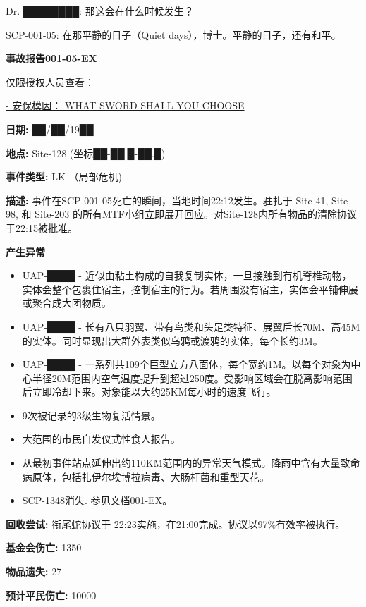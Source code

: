 \documentclass[openany,a4paper]{book} %
\begin{document}
Dr. ████████: 那这会在什么时候发生？

SCP-001-05: 在那平静的日子（Quiet days），博士。平静的日子，还有和平。\vspace{36pt}

\textbf{事故报告001-05-EX}

{\tiny{仅限授权人员查看：}}
\begin{colorboxed}
  {\color{red}\uline{- 安保模因： WHAT SWORD SHALL YOU CHOOSE}}\vspace{12pt}

\textbf{日期: }██/██/19██\vspace{12pt}

\textbf{地点: }Site-128 (坐标██-██.█-██.█)\vspace{12pt}

\textbf{事件类型: }LK （局部危机)\vspace{12pt}

\textbf{描述: }事件在SCP-001-05死亡的瞬间，当地时间22:12发生。驻扎于 Site-41, Site-98, 和 Site-203 的所有MTF小组立即展开回应。对Site-128内所有物品的清除协议于22:15被批准。\vspace{12pt}

\textbf{产生异常}\vspace{12pt}

\begin{itemize}
  \item UAP-████ - 近似由粘土构成的自我复制实体，一旦接触到有机脊椎动物，实体会整个包裹住宿主，控制宿主的行为。若周围没有宿主，实体会平铺伸展或聚合成大团物质。
  \item UAP-████ - 长有八只羽翼、带有鸟类和头足类特征、展翼后长70M、高45M的实体。同时显现出大群外表类似乌鸦或渡鸦的实体，每个长约3M。
  \item UAP-████ - 一系列共109个巨型立方八面体，每个宽约1M。以每个对象为中心半径20M范围内空气温度提升到超过250度。受影响区域会在脱离影响范围后立即冷却下来。对象能以大约25KM每小时的速度飞行。
  \item 9次被记录的3级生物复活情景。
  \item 大范围的市民自发仪式性食人报告。
  \item 从最初事件站点延伸出约110KM范围内的异常天气模式。降雨中含有大量致命病原体，包括扎伊尔埃博拉病毒、大肠杆菌和重型天花。
  \item \hyperref[chap:SCP-1348]{SCP-1348}消失. 参见文档001-EX。
\end{itemize}\vspace{12pt}

\textbf{回收尝试:} 衔尾蛇协议于 22:23实施，在21:00完成。协议以97\%有效率被执行。\vspace{12pt}

\textbf{基金会伤亡:} 1350

\textbf{物品遗失: }27

\textbf{预计平民伤亡:} 10000
\end{colorboxed}
\end{document}
